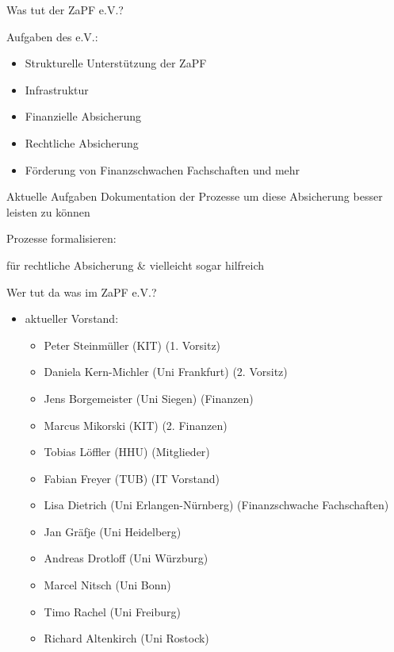 \documentclass[compress, aspectratio=169]{beamer}
\begin{document}
\pagestyle{empty}
\begin{frame}{Was tut der ZaPF e.V.?}
\begin{block}{Aufgaben des e.V.:}
\begin{itemize}
\item Strukturelle Unterstützung der ZaPF
\item Infrastruktur
\item Finanzielle Absicherung
\item Rechtliche Absicherung
\item Förderung von Finanzschwachen Fachschaften und mehr
\end{itemize}
\end{block}
\pause
\begin{block}{Aktuelle Aufgaben}
Dokumentation der Prozesse um diese Absicherung besser leisten zu können
\end{block}
\end{frame}

\thispagestyle{empty}
\begin{frame}{Prozesse formalisieren:}
  \begin{center}
  \end{center}
    für rechtliche Absicherung \& vielleicht sogar hilfreich
\end{frame}


\thispagestyle{empty}
\begin{frame}{Wer tut da was im ZaPF e.V.?}
    \begin{itemize}
        \item[] aktueller Vorstand:
        \begin{itemize}
             \item Peter Steinmüller (KIT) (1. Vorsitz)
             \item Daniela Kern-Michler (Uni Frankfurt) (2. Vorsitz)
             \item Jens Borgemeister (Uni Siegen) (Finanzen)
             \item Marcus Mikorski (KIT) (2. Finanzen)
             \item Tobias Löffler (HHU) (Mitglieder)
             \item Fabian Freyer (TUB) (IT Vorstand)
             \item Lisa Dietrich (Uni Erlangen-Nürnberg)  (Finanzschwache Fachschaften)
             \item Jan Gräfje (Uni Heidelberg)
             \item Andreas Drotloff (Uni Würzburg)
             \item Marcel Nitsch (Uni Bonn)
             \item Timo Rachel (Uni Freiburg)
             \item Richard Altenkirch (Uni Rostock)
        \end{itemize}
    \end{itemize}
\end{frame}
\end{document}
